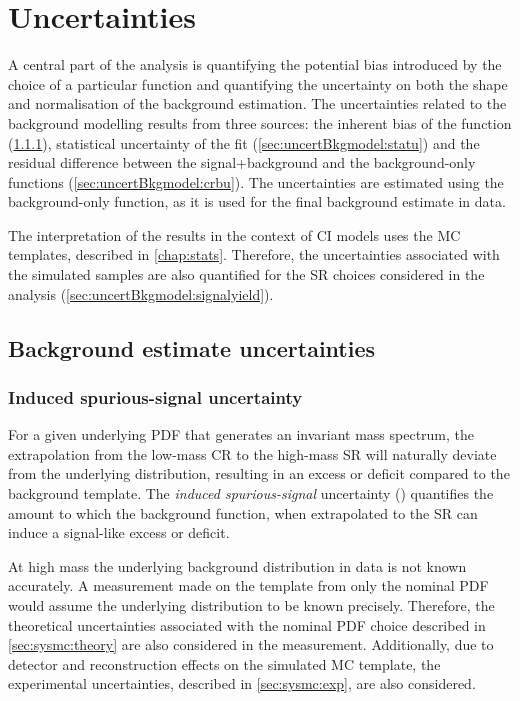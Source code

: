 \chapter{Uncertainties}\label{chap:uncertBkgmodel}
A central part of the analysis is quantifying the potential bias introduced by the choice of a particular function and quantifying the uncertainty on both the shape and normalisation of the background estimation. The uncertainties related to the background modelling results from three sources: the inherent bias of the function (\cref{sec:uncertBkgmodel:iss}), statistical uncertainty of the fit (\cref{sec:uncertBkgmodel:statu}) and the residual difference between the signal+background and the background-only functions (\cref{sec:uncertBkgmodel:crbu}). The uncertainties are estimated using the background-only function, as it is used for the final background estimate in data. 

The interpretation of the results in the context of CI models uses the MC templates, described in \cref{chap:stats}. Therefore, the uncertainties associated with the simulated samples are also quantified for the SR choices considered in the analysis (\cref{sec:uncertBkgmodel:signalyield}).
 
\section{Background estimate uncertainties}

\subsection{Induced spurious-signal uncertainty}\label{sec:uncertBkgmodel:iss}
For a given underlying PDF that generates an invariant mass spectrum, the extrapolation from the low-mass CR to the high-mass SR will naturally deviate from the underlying distribution, resulting in an excess or deficit compared to the background template. The \emph{induced spurious-signal} uncertainty (\ISSU) quantifies the amount to which the background function, when extrapolated to the SR can induce a signal-like excess or deficit. 

At high mass the underlying background distribution in data is not known accurately. A \ISSU measurement made on the template from only the nominal PDF would assume the underlying distribution to be known precisely. Therefore, the theoretical uncertainties associated with the nominal PDF choice described in \cref{sec:sysmc:theory} are also considered in the \ISSU measurement. Additionally, due to detector and reconstruction effects on the simulated MC template, the experimental uncertainties, described in \cref{sec:sysmc:exp}, are also considered. 

